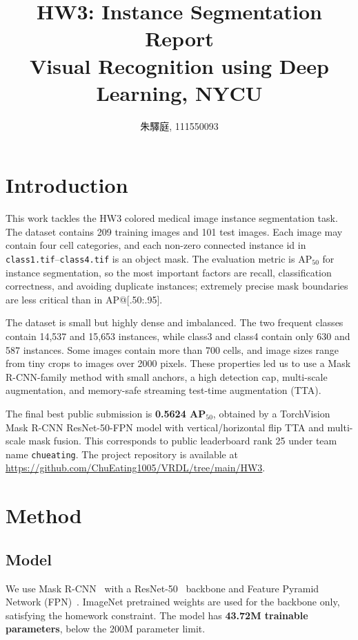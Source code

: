 \documentclass[10pt,twocolumn,letterpaper]{article}
\begin{document}
\title{\LARGE HW3: Instance Segmentation Report \\[0.5em] \large Visual Recognition using Deep Learning, NYCU}
\author{朱驛庭, 111550093}
\maketitle

\section{Introduction}
\label{sec:intro}

This work tackles the HW3 colored medical image instance segmentation task. The dataset contains 209 training images and 101 test images. Each image may contain four cell categories, and each non-zero connected instance id in \texttt{class1.tif}--\texttt{class4.tif} is an object mask. The evaluation metric is AP$_{50}$ for instance segmentation, so the most important factors are recall, classification correctness, and avoiding duplicate instances; extremely precise mask boundaries are less critical than in AP@[.50:.95].

The dataset is small but highly dense and imbalanced. The two frequent classes contain 14{,}537 and 15{,}653 instances, while class3 and class4 contain only 630 and 587 instances. Some images contain more than 700 cells, and image sizes range from tiny crops to images over 2000 pixels. These properties led us to use a Mask R-CNN-family method with small anchors, a high detection cap, multi-scale augmentation, and memory-safe streaming test-time augmentation (TTA).

The final best public submission is \textbf{0.5624 AP$_{50}$}, obtained by a TorchVision Mask R-CNN ResNet-50-FPN model with vertical/horizontal flip TTA and multi-scale mask fusion. This corresponds to public leaderboard rank 25 under team name \texttt{chueating}. The project repository is available at \url{https://github.com/ChuEating1005/VRDL/tree/main/HW3}.

\section{Method}
\label{sec:method}

\subsection{Model}
We use Mask R-CNN~\cite{he2017mask} with a ResNet-50~\cite{he2016resnet} backbone and Feature Pyramid Network (FPN)~\cite{lin2017fpn}. ImageNet pretrained weights are used for the backbone only, satisfying the homework constraint. The model has \textbf{43.72M trainable parameters}, below the 200M parameter limit.
\end{document}
